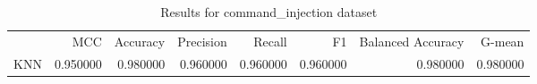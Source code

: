 \begin{table}
\caption{Results for command_injection dataset}
\begin{tabular}{lrrrrrrr}
 & MCC & Accuracy & Precision & Recall & F1 & Balanced Accuracy & G-mean \\
KNN & 0.950000 & 0.980000 & 0.960000 & 0.960000 & 0.960000 & 0.980000 & 0.980000 \\
\end{tabular}
\end{table}
